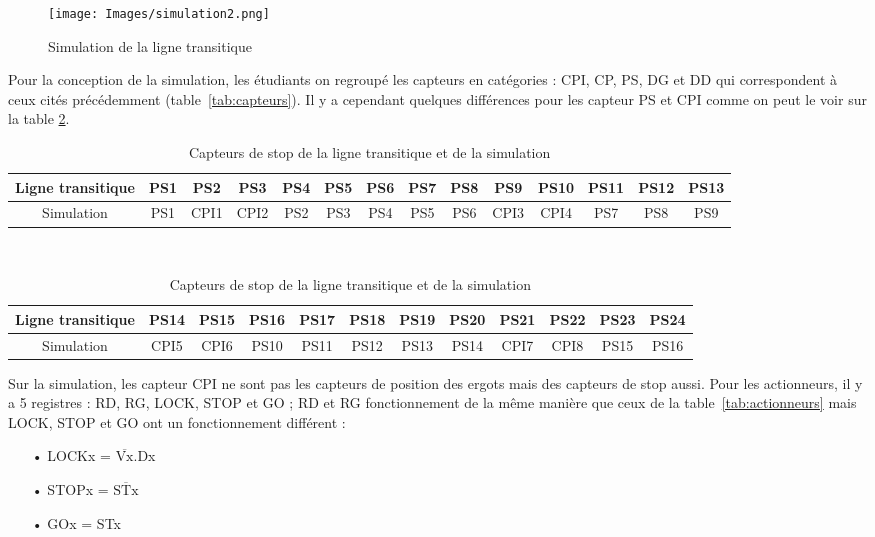 \documentclass[a4paper,french, titlepage]{book}
\begin{document}
\begin{figure}[H]
	     \begin{center}
	     \texttt{[image: Images/simulation2.png]} 
	     \end{center}
	     \caption{Simulation de la ligne transitique}
	     \label{Simulation}
\end{figure}

Pour la conception de la simulation, les étudiants on regroupé les capteurs en catégories : CPI, CP, PS, DG et DD qui correspondent à ceux cités précédemment (table~\ref{tab:capteurs}). Il y a cependant quelques différences pour les capteur PS et CPI comme on peut le voir sur la table \ref{tab:capteur_simu}.


\begin{table}[H]

 	  
\begin{center}
	\begin{tabular}{|c||c|c|c|c|c|c|c|c|c|c|c|c|c|}
	\hline Ligne transitique   &PS1&PS2&PS3&PS4&PS5&PS6&PS7&PS8&PS9&PS10&PS11&PS12&PS13\\
	\hline Simulation   &PS1&CPI1&CPI2&PS2&PS3&PS4&PS5&PS6&CPI3&CPI4&PS7&PS8&PS9\\
	\hline
	\end{tabular} 
	\\[0.7cm]
	\begin{tabular}{|c||c|c|c|c|c|c|c|c|c|c|c|}
	\hline Ligne transitique   &PS14&PS15&PS16&PS17&PS18&PS19&PS20&PS21&PS22&PS23&PS24\\
	\hline Simulation   &CPI5&CPI6&PS10&PS11&PS12&PS13&PS14&CPI7&CPI8&PS15&PS16\\
	\hline
	\end{tabular}       
\end{center}
\caption{\label{tab:capteur_simu}Capteurs de stop de la ligne transitique et de la simulation}
\end{table}

\newpage
Sur la simulation, les capteur CPI ne sont pas les capteurs de position des ergots mais des capteurs de stop aussi. Pour les actionneurs, il y a 5 registres : RD, RG, LOCK, STOP et GO ; RD et RG fonctionnement de la même manière que ceux de la table~\ref{tab:actionneurs} mais LOCK, STOP et GO ont un fonctionnement différent :

\begin{itemize}
\item[ ]
\item[•] LOCKx = $\overline{\text{Vx}}$.Dx
\item[•] STOPx = $\overline{\text{STx}}$
\item[•] GOx = STx
\item[ ]
\end{itemize}
\end{document}
